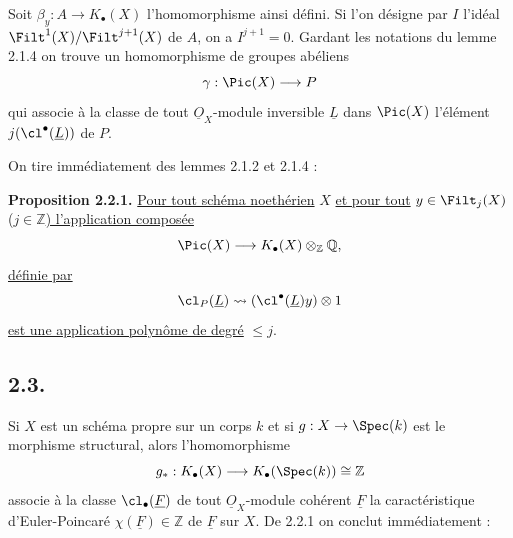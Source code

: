 
Soit $\beta_y:A\to K_\bullet(X)$ l'homomorphisme ainsi défini. Si l'on désigne par $I$ l'idéal $\Filt^1(X)/\Filt^{j+1}(X)$ de $A$, on a $I^{j+1}=0$. Gardant les notations du lemme 2.1.4 on trouve un homomorphisme de groupes abéliens
\[
\gamma:\Pic(X)\longrightarrow P
\]
qui associe à la classe de tout $\underline{O}_X$-module inversible $\underline{L}$ dans $\Pic(X)$ l'élément $j(\cl^{\bullet}(\underline{L}))$ de $P$.

On tire immédiatement des lemmes 2.1.2 et 2.1.4 :

\textbf{Proposition 2.2.1.} \uline{Pour tout schéma noethérien} $X$ \uline{et pour tout} $y\in\Filt_j(X)$ ($j\in\mathbb Z$\uline{) l'application composée}
\[
\Pic(X)\longrightarrow K_\bullet(X)\otimes_{\mathbb Z}\mathbb Q,
\]
\uline{définie par}
\[
\cl_P(\underline{L})\rightsquigarrow (\cl^{\bullet}(\underline{L})y)\otimes1
\]
\uline{est une application polynôme de degré} $\leq j$.

\subsection*{2.3.}
Si $X$ est un schéma propre sur un corps $k$ et si $g:X\to\Spec(k)$ est le morphisme structural, alors l'homomorphisme
\[
g_*:K_\bullet(X)\longrightarrow K_\bullet(\Spec(k))\cong\mathbb Z
\]
associe à la classe $\cl_\bullet(\underline{F})$ de tout $\underline{O}_X$-module cohérent $\underline{F}$ la caractéristique d'Euler-Poincaré $\chi(\underline{F})\in\mathbb Z$ de $\underline{F}$ sur $X$. De 2.2.1 on conclut immédiatement :

